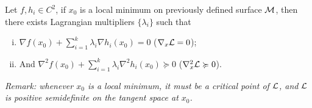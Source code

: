 \documentclass{article}
\begin{document}
   	\begin{theorem}
   		Let $f, h_i \in C^2$, if $x_0$ is a local minimum on previously defined surface $\mathcal{{M}}$, then there exists Lagrangian multipliers $\{\lambda_i\}$ such that
   		\begin{enumerate}[(i)]
   			\item $\nabla f(x_0) + \sum_{i=1}^k \lambda_i \nabla h_i(x_0) = 0$ ($\nabla_x \mathcal{{L}} = 0$);
   			\item And $\nabla^2 f(x_0) + \sum_{i=1}^k \lambda_i \nabla^2 h_i(x_0) \succcurlyeq 0$  ($\nabla_x^2 \mathcal{{L}} \succcurlyeq 0$).
   		\end{enumerate}
   		\emph{Remark: whenever $x_0$ is a local minimum, it must be a critical point of $\mathcal{{L}}$, and $\mathcal{{L}}$ is positive semidefinite on the tangent space at $x_0$.}
   	\end{theorem}
   	
\end{document}
